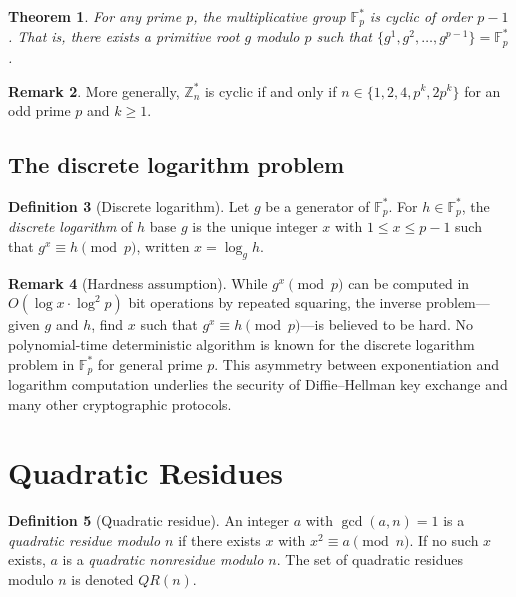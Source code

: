 \documentclass[twoside,12pt]{book}
\theoremstyle{plain}
\newtheorem{theorem}{Theorem}[chapter]
\theoremstyle{definition}
\newtheorem{definition}[theorem]{Definition}
\newtheorem{remark}[theorem]{Remark}
\theoremstyle{remark}
\begin{document}
\begin{theorem}
\label{thm:cyclic}
For any prime $p$, the multiplicative group $\mathbb{F}_p^*$ is cyclic of order $p - 1$. That is, there exists a \emph{primitive root} $g$ modulo $p$ such that $\{g^1, g^2, \ldots, g^{p-1}\} = \mathbb{F}_p^*$.
\end{theorem}

\begin{remark}
More generally, $\mathbb{Z}_n^*$ is cyclic if and only if $n \in \{1, 2, 4, p^k, 2p^k\}$ for an odd prime $p$ and $k \geq 1$.
\end{remark}

\subsection{The discrete logarithm problem}

\begin{definition}[Discrete logarithm]
Let $g$ be a generator of $\mathbb{F}_p^*$. For $h \in \mathbb{F}_p^*$, the \emph{discrete logarithm} of $h$ base $g$ is the unique integer $x$ with $1 \leq x \leq p-1$ such that $g^x \equiv h \pmod{p}$, written $x = \log_g h$.
\end{definition}

\begin{remark}[Hardness assumption]
While $g^x \pmod{p}$ can be computed in $O(\log x \cdot \log^2 p)$ bit operations by repeated squaring, the inverse problem---given $g$ and $h$, find $x$ such that $g^x \equiv h \pmod{p}$---is believed to be hard. No polynomial-time deterministic algorithm is known for the discrete logarithm problem in $\mathbb{F}_p^*$ for general prime $p$. This asymmetry between exponentiation and logarithm computation underlies the security of Diffie--Hellman key exchange and many other cryptographic protocols.
\end{remark}

\section{Quadratic Residues}
\label{sec:quadratic-residues}

\begin{definition}[Quadratic residue]
An integer $a$ with $\gcd(a, n) = 1$ is a \emph{quadratic residue modulo $n$} if there exists $x$ with $x^2 \equiv a \pmod{n}$. If no such $x$ exists, $a$ is a \emph{quadratic nonresidue modulo $n$}. The set of quadratic residues modulo $n$ is denoted $QR(n)$.
\end{definition}
\end{document}
